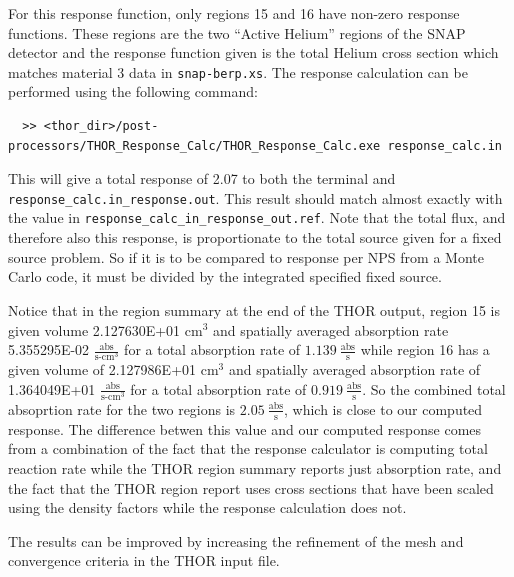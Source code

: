 For this response function, only regions 15 and 16 have non-zero response functions.
These regions are the two ``Active Helium'' regions of the SNAP detector and the response function given is the total Helium cross section which matches material 3 data in \verb"snap-berp.xs".
The response calculation can be performed using the following command:
\begin{verbatim}
  >> <thor_dir>/post-processors/THOR_Response_Calc/THOR_Response_Calc.exe response_calc.in
\end{verbatim}
This will give a total response of 2.07 to both the terminal and \verb"response_calc.in_response.out".
This result should match almost exactly with the value in \verb"response_calc_in_response_out.ref".
Note that the total flux, and therefore also this response, is proportionate to the total source given for a fixed source problem.
So if it is to be compared to response per NPS from a Monte Carlo code, it must be divided by the integrated specified fixed source.

Notice that in the region summary at the end of the THOR output, region 15 is given volume 2.127630E+01 cm$^3$ and spatially averaged absorption rate 5.355295E-02 $\frac{\text{abs}}{\text{s-cm}^3}$ for a total absorption rate of $1.139~\frac{\text{abs}}{\text{s}}$ while region 16 has a given volume of 2.127986E+01 cm$^3$ and spatially averaged absorption rate of 1.364049E+01 $\frac{\text{abs}}{\text{s-cm}^3}$ for a total absorption rate of $0.919~\frac{\text{abs}}{\text{s}}$.
So the combined total absoprtion rate for the two regions is $2.05~\frac{\text{abs}}{\text{s}}$, which is close to our computed response.
The difference betwen this value and our computed response comes from a combination of the fact that the response calculator is computing total reaction rate while the THOR region summary reports just absorption rate, and the fact that the THOR region report uses cross sections that have been scaled using the density factors while the response calculation does not.

The results can be improved by increasing the refinement of the mesh and convergence criteria in the THOR input file.
